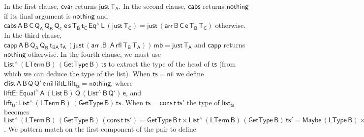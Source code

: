 \documentclass[9pt]{entcs}
\begin{document}
In the first clause, $\mathsf{cvar}$ returns $\mathsf{just\,T_A}$.  In
the second clause, $\mathsf{cabs}$ returns $\mathsf{nothing}$ if its
final argument is $\mathsf{nothing}$ and $\mathsf{cabs\, A \,B \,C
  \,Q_A\, Q_B \,Q_C\, e \,s \,T_B\, t_C\, Eq^\wedge\,
L\, (just \,T_C) = just \, (arr\, B\, C\, e\, T_B \,T_C)}$ otherwise.
In the third clause, $\mathsf{capp\, A \,B \, Q_A \, Q_B \, t_{BA}\,
  t_A \, (just \, (arr\, .B \,.A\, rfl\, T_B\, T_A))\, mb = just\,
  T_A}$ and $\mathsf{capp}$ returns $\mathsf{nothing}$ otherwise.  In
the fourth clause, we must use $\mathsf{List^{\wedge}\, (LTerm\, B)\,
  (GetType\, B)\, ts}$ to extract the type of the head of
$\mathsf{ts}$ (from which we can deduce the type of the list). When
$\mathsf{ts} = \mathsf{nil}$ we define $\mathsf{clist\, A\, B\, Q\,
  Q'\, e\, nil \, liftE\, lift_{ts} = nothing}$, where $\mathsf{liftE
  : Equal^{\wedge}\, A\, (List\,B) \, Q\, (List^{\wedge}\, B\, Q')\,
  e}$, and $\mathsf{lift_{ts} : List^{\wedge}\, (LTerm\, B)\,
  (GetType\, B)\, ts}$.  When $\mathsf{ts} = \mathsf{cons\,t\,ts'}$
the type of $\mathsf{list_{ts}}$ becomes $\mathsf{List^{\wedge}\,
  (LTerm\, B)\, (GetType\, B)\, (cons\, t\, ts')} = \mathsf{GetType\,
  B\, t \times List^{\wedge}\, (LTerm\, B)\, (GetType\, B)\, ts'} =
\mathsf{Maybe\, (LType\, B) \times List^{\wedge}\, (LTerm\, B)\,
  (GetType\, B)\, ts'}$. We pattern match on the first component
of the pair to define
\end{document}
